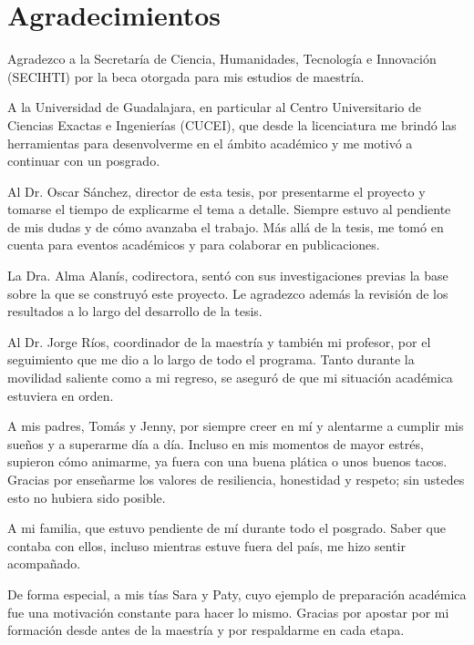 \documentclass{report}
\begin{document}
\newpage

\chapter*{Agradecimientos}

\begingroup
\setlength{\parskip}{1em}      %
\setlength{\parindent}{0pt}    %


Agradezco a la Secretaría de Ciencia, Humanidades, Tecnología e Innovación (SECIHTI) por la beca otorgada para mis estudios de maestría. %

A la Universidad de Guadalajara, en particular al Centro Universitario de Ciencias Exactas e Ingenierías (CUCEI), que desde la licenciatura me brindó las herramientas para desenvolverme en el ámbito académico y me motivó a continuar con un posgrado.

Al Dr. Oscar Sánchez, director de esta tesis, por presentarme el proyecto y tomarse el tiempo de explicarme el tema a detalle. Siempre estuvo al pendiente de mis dudas y de cómo avanzaba el trabajo. Más allá de la tesis, me tomó en cuenta para eventos académicos y para colaborar en publicaciones.

La Dra. Alma Alanís, codirectora, sentó con sus investigaciones previas la base sobre la que se construyó este proyecto. Le agradezco además la revisión de los resultados a lo largo del desarrollo de la tesis.

Al Dr. Jorge Ríos, coordinador de la maestría y también mi profesor, por el seguimiento que me dio a lo largo de todo el programa. Tanto durante la movilidad saliente como a mi regreso, se aseguró de que mi situación académica estuviera en orden.

A mis padres, Tomás y Jenny, por siempre creer en mí y alentarme a cumplir mis sueños y a superarme día a día. Incluso en mis momentos de mayor estrés, supieron cómo animarme, ya fuera con una buena plática o unos buenos tacos. Gracias por enseñarme los valores de resiliencia, honestidad y respeto; sin ustedes esto no hubiera sido posible.

A mi familia, que estuvo pendiente de mí durante todo el posgrado. Saber que contaba con ellos, incluso mientras estuve fuera del país, me hizo sentir acompañado. 

De forma especial, a mis tías Sara y Paty, cuyo ejemplo de preparación académica fue una motivación constante para hacer lo mismo. Gracias por apostar por mi formación desde antes de la maestría y por respaldarme en cada etapa. 
\end{document}
